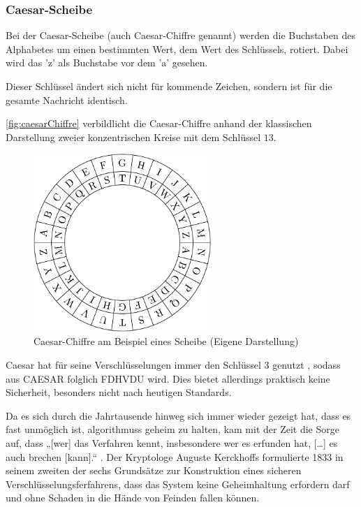 \subsubsection{Caesar-Scheibe}\label{subsubsec:caesar-chiffre}
Bei der Caesar-Scheibe (auch Caesar-Chiffre genannt) werden die Buchstaben des Alphabetes
um einen bestimmten Wert, dem Wert des Schlüssels, rotiert. Dabei wird das 'z' als Buchstabe vor dem 'a' gesehen. 

Dieser Schlüssel ändert sich nicht für kommende Zeichen, sondern ist für die gesamte Nachricht identisch. 

\par \autoref{fig:caesarChiffre} verbildlicht die Caesar-Chiffre anhand der klassischen Darstellung zweier konzentrischen Kreise mit dem Schlüssel $13$.
\begin{figure}[htbp]
	\includegraphics[width=0.6\textwidth]{abbildungen/caesar-chiffre}
	\centering
	\caption[
	Caesar-Chifre am Beispiel einer Scheibe]{Caesar-Chiffre am Beispiel eines Scheibe (Eigene Darstellung)}
	\label{fig:caesarChiffre}
\end{figure}

Caesar hat für seine Verschlüsselungen immer den Schlüssel 3 genutzt \autocite[]{beutelspacher_kurze_2017}, sodass aus CAESAR folglich FDHVDU wird. 
Dies bietet allerdings praktisch keine Sicherheit, besonders nicht nach heutigen Standards.

\par Da es sich durch die Jahrtausende hinweg sich immer wieder gezeigt hat, dass
es fast unmöglich ist, \glspl{algorithmus} geheim zu halten, kam mit der Zeit
die Sorge auf, dass „[wer] das Verfahren kennt, insbesondere wer es erfunden hat,
[…] es auch brechen [kann].“ \autocite{beutelspacher_kurze_2017}. Der Kryptologe Auguste
Kerckhoffs formulierte 1833 in seinem zweiten der sechs Grundsätze zur Konstruktion
eines sicheren Verschlüsselungsferfahrens, dass das System keine Geheimhaltung erfordern darf und ohne Schaden in die Hände von Feinden fallen können. \autocite[Übersetzt aus dem Französischen]{petitcolas_information_nodate}

